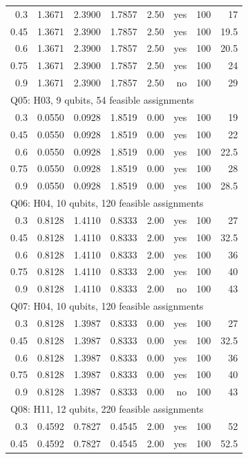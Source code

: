 \begin{longtable}{rrrrlrrr}
0.3 & 1.3671 & 2.3900 & 1.7857 & 2.50 & yes & 100 & 17 \\
0.45 & 1.3671 & 2.3900 & 1.7857 & 2.50 & yes & 100 & 19.5 \\
0.6 & 1.3671 & 2.3900 & 1.7857 & 2.50 & yes & 100 & 20.5 \\
0.75 & 1.3671 & 2.3900 & 1.7857 & 2.50 & yes & 100 & 24 \\
0.9 & 1.3671 & 2.3900 & 1.7857 & 2.50 & no & 100 & 29 \\
\multicolumn{8}{l}{Q05: H03, 9 qubits, 54 feasible assignments} \\
0.3 & 0.0550 & 0.0928 & 1.8519 & 0.00 & yes & 100 & 19 \\
0.45 & 0.0550 & 0.0928 & 1.8519 & 0.00 & yes & 100 & 22 \\
0.6 & 0.0550 & 0.0928 & 1.8519 & 0.00 & yes & 100 & 22.5 \\
0.75 & 0.0550 & 0.0928 & 1.8519 & 0.00 & yes & 100 & 28 \\
0.9 & 0.0550 & 0.0928 & 1.8519 & 0.00 & yes & 100 & 28.5 \\
\multicolumn{8}{l}{Q06: H04, 10 qubits, 120 feasible assignments} \\
0.3 & 0.8128 & 1.4110 & 0.8333 & 2.00 & yes & 100 & 27 \\
0.45 & 0.8128 & 1.4110 & 0.8333 & 2.00 & yes & 100 & 32.5 \\
0.6 & 0.8128 & 1.4110 & 0.8333 & 2.00 & yes & 100 & 36 \\
0.75 & 0.8128 & 1.4110 & 0.8333 & 2.00 & yes & 100 & 40 \\
0.9 & 0.8128 & 1.4110 & 0.8333 & 2.00 & no & 100 & 43 \\
\multicolumn{8}{l}{Q07: H04, 10 qubits, 120 feasible assignments} \\
0.3 & 0.8128 & 1.3987 & 0.8333 & 0.00 & yes & 100 & 27 \\
0.45 & 0.8128 & 1.3987 & 0.8333 & 0.00 & yes & 100 & 32.5 \\
0.6 & 0.8128 & 1.3987 & 0.8333 & 0.00 & yes & 100 & 36 \\
0.75 & 0.8128 & 1.3987 & 0.8333 & 0.00 & yes & 100 & 40 \\
0.9 & 0.8128 & 1.3987 & 0.8333 & 0.00 & no & 100 & 43 \\
\multicolumn{8}{l}{Q08: H11, 12 qubits, 220 feasible assignments} \\
0.3 & 0.4592 & 0.7827 & 0.4545 & 2.00 & yes & 100 & 52 \\
0.45 & 0.4592 & 0.7827 & 0.4545 & 2.00 & yes & 100 & 52.5 \\

\end{longtable}

